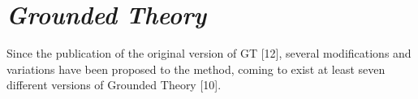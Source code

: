 \section{\textit{Grounded Theory}}
Since the publication of the original version of GT [12], several
modifications and variations have been proposed to the method,
coming to exist at least seven different versions of Grounded Theory [10]. 



